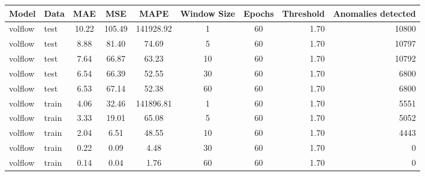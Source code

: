 \begin{tabular}{llcccccrr}
\hline
Model & Data & MAE & MSE & MAPE & Window Size & Epochs & Threshold & Anomalies detected \\
\hline
volflow & test & 10.22 & 105.49 & 141928.92 & 1 & 60 & 1.70 & 10800 \\
volflow & test & 8.88 & 81.40 & 74.69 & 5 & 60 & 1.70 & 10797 \\
volflow & test & 7.64 & 66.87 & 63.23 & 10 & 60 & 1.70 & 10792 \\
volflow & test & 6.54 & 66.39 & 52.55 & 30 & 60 & 1.70 & 6800 \\
volflow & test & 6.53 & 67.14 & 52.38 & 60 & 60 & 1.70 & 6800 \\
volflow & train & 4.06 & 32.46 & 141896.81 & 1 & 60 & 1.70 & 5551 \\
volflow & train & 3.33 & 19.01 & 65.08 & 5 & 60 & 1.70 & 5052 \\
volflow & train & 2.04 & 6.51 & 48.55 & 10 & 60 & 1.70 & 4443 \\
volflow & train & 0.22 & 0.09 & 4.48 & 30 & 60 & 1.70 & 0 \\
volflow & train & 0.14 & 0.04 & 1.76 & 60 & 60 & 1.70 & 0 \\
\hline
\end{tabular}
